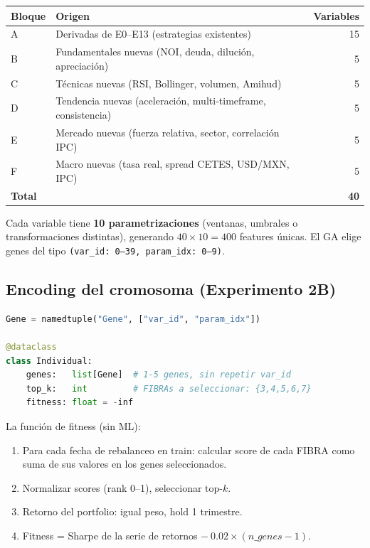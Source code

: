 \documentclass[12pt, a4paper]{article}
\begin{document}
\begin{center}
\begin{tabular}{llr}
  \toprule
  \textbf{Bloque} & \textbf{Origen} & \textbf{Variables} \\
  \midrule
  A & Derivadas de E0--E13 (estrategias existentes) & 15 \\
  B & Fundamentales nuevas (NOI, deuda, dilución, apreciación) & 5 \\
  C & T\'{e}cnicas nuevas (RSI, Bollinger, volumen, Amihud) & 5 \\
  D & Tendencia nuevas (aceleraci\'{o}n, multi-timeframe, consistencia) & 5 \\
  E & Mercado nuevas (fuerza relativa, sector, correlaci\'{o}n IPC) & 5 \\
  F & Macro nuevas (tasa real, spread CETES, USD/MXN, IPC) & 5 \\
  \midrule
  \multicolumn{2}{l}{\textbf{Total}} & \textbf{40} \\
  \bottomrule
\end{tabular}
\end{center}

Cada variable tiene \textbf{10 parametrizaciones} (ventanas, umbrales o transformaciones distintas),
generando $40 \times 10 = 400$ features \'{u}nicas. El GA elige genes del tipo
\texttt{(var\_id: 0--39,\ param\_idx: 0--9)}.

\subsection{Encoding del cromosoma (Experimento 2B)}

\begin{lstlisting}[language=Python]
Gene = namedtuple("Gene", ["var_id", "param_idx"])

@dataclass
class Individual:
    genes:   list[Gene]  # 1-5 genes, sin repetir var_id
    top_k:   int         # FIBRAs a seleccionar: {3,4,5,6,7}
    fitness: float = -inf
\end{lstlisting}

La funci\'{o}n de fitness (sin ML):
\begin{enumerate}
  \item Para cada fecha de rebalanceo en train: calcular score de cada FIBRA
        como suma de sus valores en los genes seleccionados.
  \item Normalizar scores (rank 0--1), seleccionar top-$k$.
  \item Retorno del portfolio: igual peso, hold 1 trimestre.
  \item Fitness = Sharpe de la serie de retornos $-\ 0.02 \times (n\_genes - 1)$.
\end{enumerate}
\end{document}
